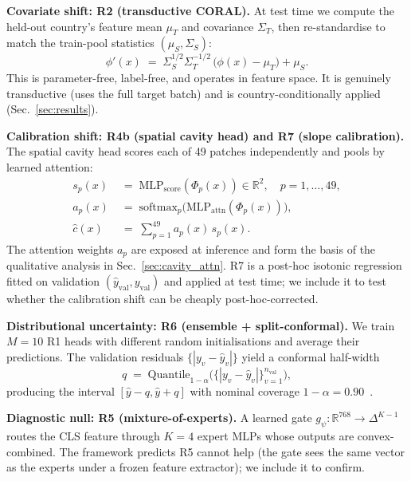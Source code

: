 \documentclass[runningheads]{llncs}
\begin{document}
\smallskip\noindent\textbf{Covariate shift: R2 (transductive CORAL).}
At test time we compute the held-out country's feature mean $\mu_T$ and covariance $\Sigma_T$, then re-standardise to match the train-pool statistics $(\mu_S, \Sigma_S)$:
\begin{equation}
\phi'(x) \;=\; \Sigma_S^{1/2}\Sigma_T^{-1/2}\,\bigl(\phi(x) - \mu_T\bigr) + \mu_S.
\label{eq:coral}
\end{equation}
This is parameter-free, label-free, and operates in feature space. It is genuinely transductive (uses the full target batch) and is country-conditionally applied (Sec.~\ref{sec:results}).

\smallskip\noindent\textbf{Calibration shift: R4b (spatial cavity head) and R7 (slope calibration).}
The spatial cavity head scores each of 49 patches independently and pools by learned attention:
\begin{align}
s_p(x) \;&=\; \mathrm{MLP}_{\text{score}}(\Phi_p(x)) \in \mathbb{R}^{2}, \quad p = 1,\dots,49, \\
a_p(x) \;&=\; \mathrm{softmax}_p\!\bigl(\mathrm{MLP}_{\text{attn}}(\Phi_p(x))\bigr), \\
\hat{c}(x) \;&=\; \sum_{p=1}^{49} a_p(x)\,s_p(x).
\label{eq:spatial_cav}
\end{align}
The attention weights $a_p$ are exposed at inference and form the basis of the qualitative analysis in Sec.~\ref{sec:cavity_attn}. R7 is a post-hoc isotonic regression~\cite{niculescu2005isotonic} fitted on validation $(\hat{y}_{\text{val}}, y_{\text{val}})$ and applied at test time; we include it to test whether the calibration shift can be cheaply post-hoc-corrected.

\smallskip\noindent\textbf{Distributional uncertainty: R6 (ensemble + split-conformal).}
We train $M{=}10$ R1 heads with different random initialisations and average their predictions. The validation residuals $\{|y_v - \hat{y}_v|\}$ yield a conformal half-width
\begin{equation}
q \;=\; \mathrm{Quantile}_{1-\alpha}\bigl(\{|y_v - \hat{y}_v|\}_{v=1}^{n_{\text{val}}}\bigr),
\label{eq:conformal}
\end{equation}
producing the interval $[\hat{y}-q, \hat{y}+q]$ with nominal coverage $1-\alpha=0.90$~\cite{angelopoulos2023conformalintro}.

\smallskip\noindent\textbf{Diagnostic null: R5 (mixture-of-experts).}
A learned gate $g_\psi : \mathbb{R}^{768} \to \Delta^{K-1}$ routes the CLS feature through $K{=}4$ expert MLPs whose outputs are convex-combined. The framework predicts R5 cannot help (the gate sees the same vector as the experts under a frozen feature extractor); we include it to confirm.
\end{document}
